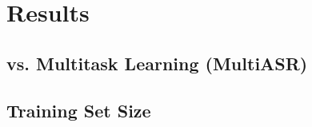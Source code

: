 \section{Results}
\label{sec:results}

\subsection{vs. Multitask Learning (MultiASR)}
\label{ssec:baseline-multitask}

\subsection{Training Set Size}
\label{ssec:training-size}


